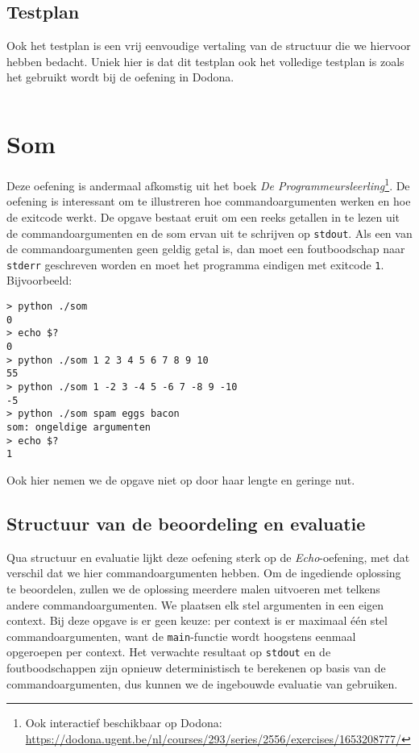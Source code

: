 \subsection{Testplan}\label{subsec:oefening-zero-testplan}

Ook het testplan is een vrij eenvoudige vertaling van de structuur die we hiervoor hebben bedacht.
Uniek hier is dat dit testplan ook het volledige testplan is zoals het gebruikt wordt bij de oefening in Dodona.

\inputminted{json}{sources/division-plan.tson}

\section{Som}\label{sec:oefeningen-som}

Deze oefening is andermaal afkomstig uit het boek \emph{De Programmeursleerling}\footnote{Ook interactief beschikbaar op Dodona: \url{https://dodona.ugent.be/nl/courses/293/series/2556/exercises/1653208777/}}.
De oefening is interessant om te illustreren hoe commandoargumenten werken en hoe de exitcode werkt.
De opgave bestaat eruit om een reeks getallen in te lezen uit de commandoargumenten en de som ervan uit te schrijven op \texttt{stdout}.
Als een van de commandoargumenten geen geldig getal is, dan moet een foutboodschap naar \texttt{stderr} geschreven worden en moet het programma eindigen met exitcode \texttt{1}.
Bijvoorbeeld:

\begin{verbatim}
> python ./som
0
> echo $?
0
> python ./som 1 2 3 4 5 6 7 8 9 10
55
> python ./som 1 -2 3 -4 5 -6 7 -8 9 -10
-5
> python ./som spam eggs bacon
som: ongeldige argumenten
> echo $?
1
\end{verbatim}

Ook hier nemen we de opgave niet op door haar lengte en geringe nut.

\subsection{Structuur van de beoordeling en evaluatie}\label{subsec:oefening-som-structuur}

Qua structuur en evaluatie lijkt deze oefening sterk op de \emph{Echo}-oefening, met dat verschil dat we hier commandoargumenten hebben.
Om de ingediende oplossing te beoordelen, zullen we de oplossing meerdere malen uitvoeren met telkens andere commandoargumenten.
We plaatsen elk stel argumenten in een eigen context.
Bij deze opgave is er geen keuze: per context is er maximaal één stel commandoargumenten, want de \texttt{main}-functie wordt hoogstens eenmaal opgeroepen per context.
Het verwachte resultaat op \texttt{stdout} en de foutboodschappen zijn opnieuw deterministisch te berekenen op basis van de commandoargumenten, dus kunnen we de ingebouwde evaluatie van \tested{} gebruiken.

